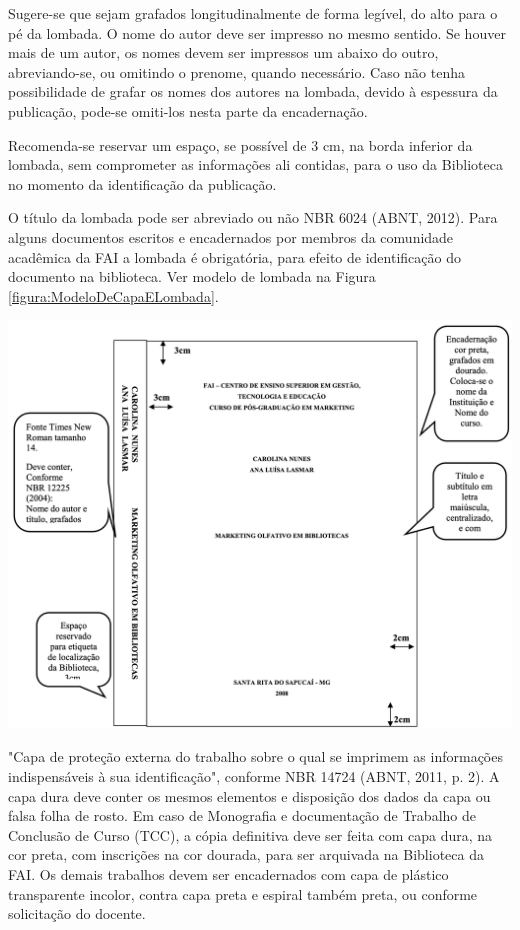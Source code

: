 \documentclass[a4paper,12pt]{article}  %
\begin{document}
\begin{ElementosTextuais}
\begin{Desenvolvimento}
Sugere-se que sejam grafados longitudinalmente de forma legível, do alto para o pé da lombada.
O nome do autor deve ser impresso no mesmo sentido. Se houver mais de um autor, os nomes devem ser impressos um abaixo do outro, abreviando-se, ou omitindo o prenome, quando necessário. Caso não tenha possibilidade de grafar os nomes dos autores na lombada, devido à espessura da publicação, pode-se omiti-los nesta parte da encadernação.

Recomenda-se reservar um espaço, se possível de 3 cm, na borda inferior da lombada, sem comprometer as informações ali contidas, para o uso da Biblioteca no momento da identificação da publicação.

O título da lombada pode ser abreviado ou não NBR 6024 (ABNT, 2012). Para alguns documentos escritos e encadernados por membros da comunidade acadêmica da FAI a lombada é obrigatória, para efeito de identificação do documento na biblioteca. Ver modelo de lombada na Figura \ref{figura:ModeloDeCapaELombada}.

\begin{figura}[h!]
  \centering
  \addfigura
  \includegraphics[width=1\textwidth]{ilustracoes/figuras/Modelo de Capa e Lombada.png}
  \label{figura:ModeloDeCapaELombada}
\end{figura}

"Capa de proteção externa do trabalho sobre o qual se imprimem as informações indispensáveis à sua identificação", conforme NBR 14724 (ABNT, 2011, p. 2). A capa dura deve conter os mesmos elementos e disposição dos dados da capa ou falsa folha de rosto. Em caso de Monografia e documentação de Trabalho de Conclusão de Curso (TCC), a cópia definitiva deve ser feita com capa dura, na cor preta, com inscrições na cor dourada, para ser arquivada na Biblioteca da FAI. Os demais trabalhos devem ser encadernados com capa de plástico transparente incolor, contra capa preta e espiral também preta, ou conforme solicitação do docente.


\end{Desenvolvimento}
\end{ElementosTextuais}
\end{document}
